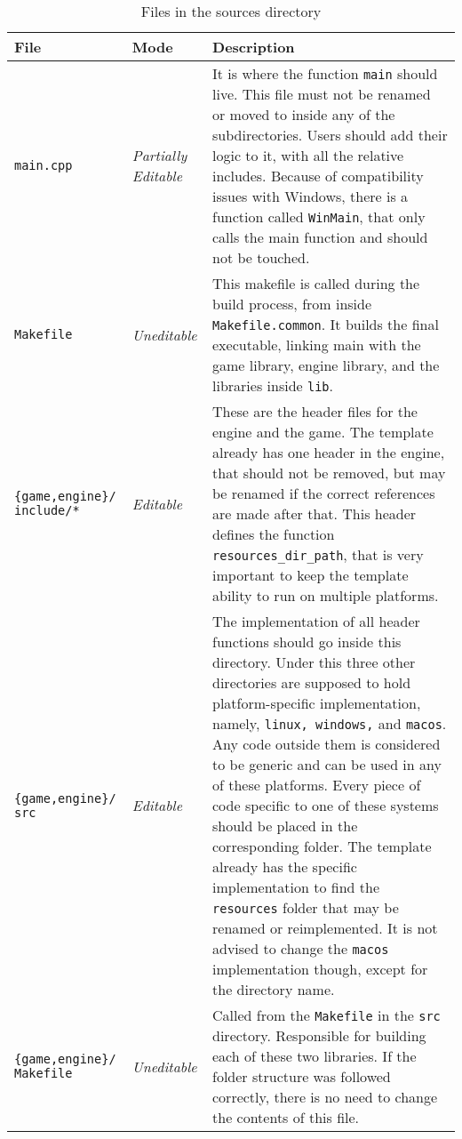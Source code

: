 \begin{longtabu} to \linewidth {XlX[2]}

\caption{Files in the sources directory}\label{tab:files_src_dir}\\
\toprule
\textbf{File} & \textbf{Mode} & \textbf{Description} \\
\midrule
\endhead

\texttt{main.cpp} & \textit{Partially Editable} & It is where the function \texttt{main} should live. This file must not be renamed or moved to inside any of the subdirectories. Users should add their logic to it, with all the relative includes. Because of compatibility issues with Windows, there is a function called \texttt{WinMain}, that only calls the main function and should not be touched. \\ \hline
\texttt{Makefile} & \textit{Uneditable} & This makefile is called during the build process, from inside \texttt{Makefile.common}. It builds the final executable, linking main with the game library, engine library, and the libraries inside \texttt{lib}. \\ \hline
\texttt{\{game,engine\}/ include/*} & \textit{Editable} & These are the header files for the engine and the game. The template already has one header in the engine, that should not be removed, but may be renamed if the correct references are made after that. This header defines the function \texttt{resources\_dir\_path}, that is very important to keep the template ability to run on multiple platforms. \\ \hline
\texttt{\{game,engine\}/ src} & \textit{Editable} & The implementation of all header functions should go inside this directory. Under this three other directories are supposed to hold platform-specific implementation, namely, \texttt{linux, windows,} and \texttt{macos}. Any code outside them is considered to be generic and can be used in any of these platforms. Every piece of code specific to one of these systems should be placed in the corresponding folder. The template already has the specific implementation to find the \texttt{resources} folder that may be renamed or reimplemented. It is not advised to change the \texttt{macos} implementation though, except for the directory name. \\ \hline
\texttt{\{game,engine\}/ Makefile} & \textit{Uneditable} & Called from the \texttt{Makefile} in the \texttt{src} directory. Responsible for building each of these two libraries. If the folder structure was followed correctly, there is no need to change the contents of this file. \\

\bottomrule
\end{longtabu}



